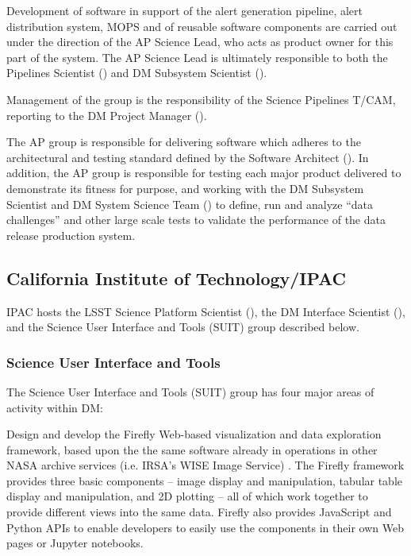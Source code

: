 Development of software in support of the alert generation \gls{pipeline}, alert distribution system, \gls{MOPS} and of reusable software components are carried out under the direction of the \gls{AP} Science Lead, who acts as product owner for this part of the system.
The \gls{AP} Science Lead is ultimately responsible to both the Pipelines Scientist () and \gls{DM} \gls{Subsystem Scientist} ().

Management of the group is the responsibility of the \gls{Science Pipelines} \gls{T/CAM}, reporting to the \gls{DM} \gls{Project Manager} ().

The \gls{AP} group is responsible for delivering software which adheres to the architectural and testing standard defined by the Software Architect ().
In addition, the \gls{AP} group is responsible for testing each major product delivered to demonstrate its fitness for purpose, and working with the \gls{DM} \gls{Subsystem Scientist} and \gls{DM} System Science Team () to define, run and analyze ``data challenges'' and other large scale tests to validate the performance of the data release production system.

\subsection {California Institute of Technology/IPAC\label{sect:ipac}}
IPAC hosts the \gls{LSST} \gls{Science Platform} Scientist (), the \gls{DM} Interface Scientist (), and the Science User Interface and Tools (\gls{SUIT}) group described below.

\subsubsection{ Science User Interface and Tools}

The Science User Interface and Tools (\gls{SUIT}) group has four major areas of activity within \gls{DM}:

Design and develop the \gls{Firefly} Web-based visualization and data exploration framework, based upon the the same software already in operations in other \gls{NASA} archive services (i.e. \gls{IRSA}’s \gls{WISE} Image Service) . The \gls{Firefly} framework provides three basic components –  image display and manipulation, tabular table display and manipulation, and \gls{2D} plotting – all of which work together to provide different views into the same data. \gls{Firefly} also provides JavaScript and Python APIs to enable developers to easily use the components in their own Web pages or Jupyter notebooks.

